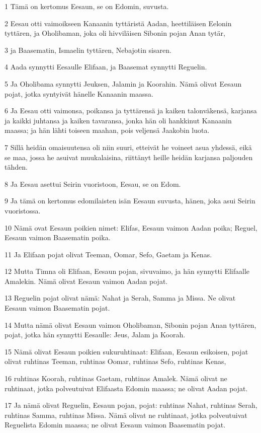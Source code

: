 \par 1 Tämä on kertomus Eesaun, se on Edomin, suvusta.
\par 2 Eesau otti vaimoikseen Kanaanin tyttäristä Aadan, heettiläisen Eelonin tyttären, ja Oholibaman, joka oli hivviläisen Sibonin pojan Anan tytär,
\par 3 ja Baasematin, Ismaelin tyttären, Nebajotin sisaren.
\par 4 Aada synnytti Eesaulle Elifaan, ja Baasemat synnytti Reguelin.
\par 5 Ja Oholibama synnytti Jeuksen, Jalamin ja Koorahin. Nämä olivat Eesaun pojat, jotka syntyivät hänelle Kanaanin maassa.
\par 6 Ja Eesau otti vaimonsa, poikansa ja tyttärensä ja kaiken talonväkensä, karjansa ja kaikki juhtansa ja kaiken tavaransa, jonka hän oli hankkinut Kanaanin maassa; ja hän lähti toiseen maahan, pois veljensä Jaakobin luota.
\par 7 Sillä heidän omaisuutensa oli niin suuri, etteivät he voineet asua yhdessä, eikä se maa, jossa he asuivat muukalaisina, riittänyt heille heidän karjansa paljouden tähden.
\par 8 Ja Eesau asettui Seirin vuoristoon, Eesau, se on Edom.
\par 9 Ja tämä on kertomus edomilaisten isän Eesaun suvusta, hänen, joka asui Seirin vuoristossa.
\par 10 Nämä ovat Eesaun poikien nimet: Elifas, Eesaun vaimon Aadan poika; Reguel, Eesaun vaimon Baasematin poika.
\par 11 Ja Elifaan pojat olivat Teeman, Oomar, Sefo, Gaetam ja Kenas.
\par 12 Mutta Timna oli Elifaan, Eesaun pojan, sivuvaimo, ja hän synnytti Elifaalle Amalekin. Nämä olivat Eesaun vaimon Aadan pojat.
\par 13 Reguelin pojat olivat nämä: Nahat ja Serah, Samma ja Missa. Ne olivat Eesaun vaimon Baasematin pojat.
\par 14 Mutta nämä olivat Eesaun vaimon Oholibaman, Sibonin pojan Anan tyttären, pojat, jotka hän synnytti Eesaulle: Jeus, Jalam ja Koorah.
\par 15 Nämä olivat Eesaun poikien sukuruhtinaat: Elifaan, Eesaun esikoisen, pojat olivat ruhtinas Teeman, ruhtinas Oomar, ruhtinas Sefo, ruhtinas Kenas,
\par 16 ruhtinas Koorah, ruhtinas Gaetam, ruhtinas Amalek. Nämä olivat ne ruhtinaat, jotka polveutuivat Elifaasta Edomin maassa; ne olivat Aadan pojat.
\par 17 Ja nämä olivat Reguelin, Eesaun pojan, pojat: ruhtinas Nahat, ruhtinas Serah, ruhtinas Samma, ruhtinas Missa. Nämä olivat ne ruhtinaat, jotka polveutuivat Reguelista Edomin maassa; ne olivat Eesaun vaimon Baasematin pojat.
